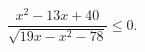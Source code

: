 \begin{ex}[type=inequality]
	\begin{condition}
		$ \dfrac{x^2 - 13x  + 40}{\sqrt{19 x - x^2 - 78}}\leqslant0.$
	\end{condition}
\end{ex}